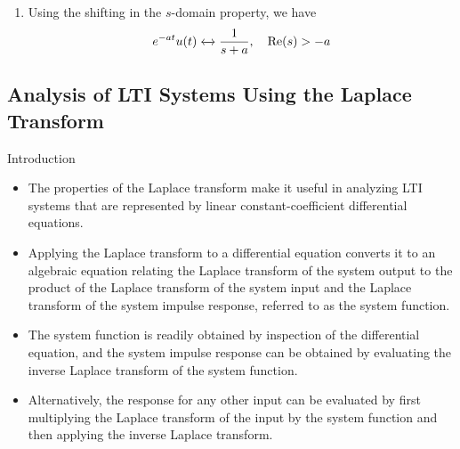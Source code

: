 \begin{frame}[allowframebreaks]{}
{\begin{enumerate}
              \begin{align*}
                tu(t) &\xleftrightarrow{}  -\frac{d}{ds}\left(\frac{1}{s}\right) = \frac{1}{s^2}, \quad \mathrm{Re}(s)>0\\
              \end{align*}
              \pause
          \item Using the shifting in the $s$-domain property, we have
              \begin{align*}
                e^{-at}u(t) &\xleftrightarrow{}  \frac{1}{s+a}, \quad \mathrm{Re}(s)>-a\\
              \end{align*}
        \end{enumerate}

    }
\end{frame}





\subsection{Analysis of LTI Systems Using the Laplace Transform}

\begin{frame}{Introduction}
    \begin{itemize}
        \item The properties of the Laplace transform make it useful in analyzing LTI systems that are represented by linear constant-coefficient differential equations.
        \item Applying the Laplace transform to a differential equation converts it to an algebraic equation relating the Laplace transform of the system output to the product of the Laplace transform of the system input and the Laplace transform of the system impulse response, referred to as the system function.
        \item The system function is readily obtained by inspection of the differential equation, and the system impulse response can be obtained by evaluating the inverse Laplace transform of the system function.
        \item Alternatively, the response for any other input can be evaluated by first multiplying the Laplace transform of the input by the system function and then applying the inverse Laplace transform.
    \end{itemize}
\end{frame}

